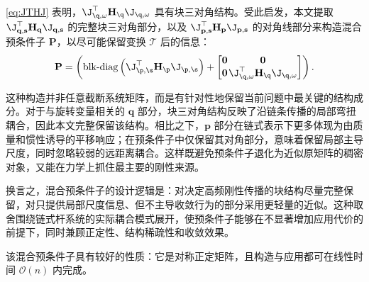 \cref{eq:JTHJ} 表明，$ \J_{\q,\omega}^\top \mathbf{H}_\q \J_{\q, \omega}$ 具有块三对角结构。受此启发，本文提取 $\J_{\mathbf{q, s}}^{\top} \mathbf{H}_{\mathbf{q}} \J_{\mathbf{q, s}}$ 的完整块三对角部分，以及 $\J^{\top}_{\mathbf{p, s}} \mathbf{H}_{\mathbf{p}} \J_{\mathbf{p, s}}$ 的对角线部分来构造混合预条件子 $\mathbf P$，以尽可能保留变换 $\mathcal T$ 后的信息：
\begin{equation}
  \setlength{\arraycolsep}{0.5pt}
  \mathbf{P} =\left(\operatorname{blk-diag}\left(\J_{\p, \s}^\top \mathbf{H}_{\p} \J_{\p, \s}\right) + \begin{bmatrix} \mathbf{0} & \mathbf{0} \\ \mathbf{0}  & \J_{\q,\omega}^\top \mathbf{H}_\q \J_{\q, \omega} \end{bmatrix}\right).
  \label{eq:preconditioner_structure}
\end{equation}

这种构造并非任意截断系统矩阵，而是有针对性地保留当前问题中最关键的结构成分。对于与旋转变量相关的 $\mathbf q$ 部分，块三对角结构反映了沿链条传播的局部弯扭耦合，因此本文完整保留该结构。相比之下，$\mathbf p$ 部分在链式表示下更多体现为由质量和惯性诱导的平移响应；在预条件子中仅保留其对角部分，意味着保留局部主导尺度，同时忽略较弱的远距离耦合。这样既避免预条件子退化为近似原矩阵的稠密对象，又能在力学上抓住最主要的刚性来源。

换言之，混合预条件子的设计逻辑是：对决定高频刚性传播的块结构尽量完整保留，对只提供局部尺度信息、但不主导收敛行为的部分采用更轻量的近似。这种取舍围绕链式杆系统的实际耦合模式展开，使预条件子能够在不显著增加应用代价的前提下，同时兼顾正定性、结构稀疏性和收敛效果。

该混合预条件子具有较好的性质：它是对称正定矩阵，且构造与应用都可在线性时间 $\mathcal{O}(n)$ 内完成。


